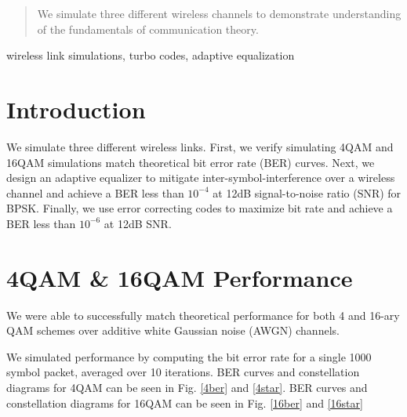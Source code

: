 \documentclass[conference]{IEEEtran}
\begin{document}
\begin{abstract}
We simulate three different wireless channels to demonstrate understanding of the fundamentals of communication theory. 

\end{abstract}

\begin{IEEEkeywords}
wireless link simulations, turbo codes, adaptive equalization 
\end{IEEEkeywords}

\section{Introduction}
We simulate three different wireless links. First, we verify simulating 4QAM and 16QAM simulations match theoretical bit error rate (BER) curves. Next, we design an adaptive equalizer to mitigate inter-symbol-interference over a wireless channel and achieve a BER less than $10^{-4}$ at 12dB signal-to-noise ratio (SNR) for BPSK. Finally, we use error correcting codes to maximize bit rate and achieve a BER less than $10^{-6}$ at 12dB SNR.

\section{4QAM \& 16QAM Performance}
We were able to successfully match theoretical performance for both 4 and 16-ary QAM schemes over additive white Gaussian noise (AWGN) channels. 

We simulated performance by computing the bit error rate for a single 1000 symbol packet, averaged over 10 iterations. BER curves and constellation diagrams for 4QAM can be seen in Fig. \ref{4ber} and \ref{4star}. BER curves and constellation diagrams for 16QAM can be seen in Fig. \ref{16ber} and \ref{16star}
\end{document}

